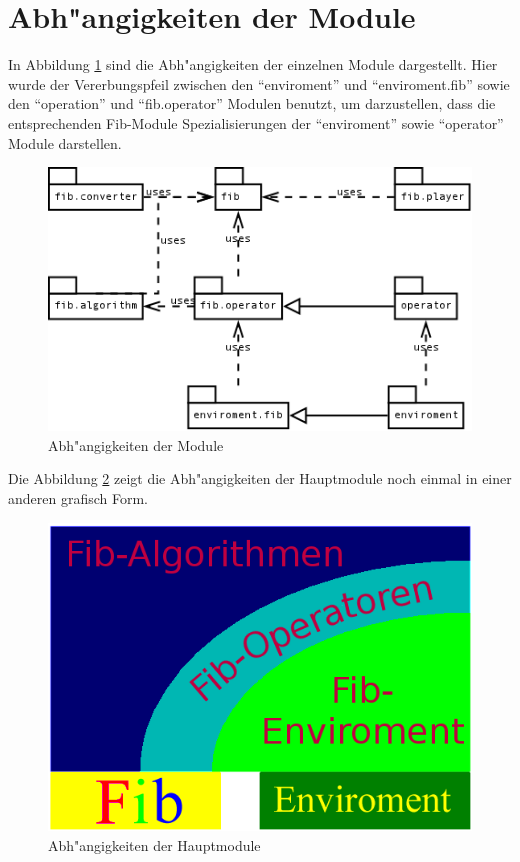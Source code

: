 \section{Abh"angigkeiten der Module}

In Abbildung \ref{figModulDependencies} sind die Abh"angigkeiten der einzelnen Module dargestellt. Hier wurde der Vererbungspfeil zwischen den ``enviroment'' und ``enviroment.fib'' sowie den ``operation'' und ``fib.operator'' Modulen benutzt, um darzustellen, dass die entsprechenden Fib-Module Spezialisierungen der ``enviroment'' sowie ``operator'' Module darstellen.

\begin{figure}[htbp]
\begin{center}
  \includegraphics[scale=0.4]{modul_dependencies}
\end{center}
\caption{Abh"angigkeiten der Module}
\label{figModulDependencies}
\end{figure}

Die Abbildung \ref{figMainModulDependencies} zeigt die Abh"angigkeiten der Hauptmodule noch einmal in einer anderen grafisch Form.

\begin{figure}[htbp]
\begin{center}
  \includegraphics[scale=0.5]{ProjektAbhaengigkeiten}
\end{center}
\caption{Abh"angigkeiten der Hauptmodule}
\label{figMainModulDependencies}
\end{figure}

